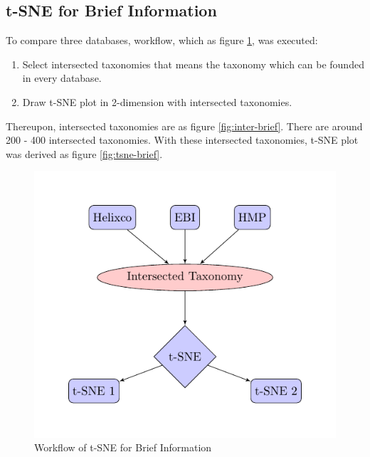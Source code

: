 \documentclass[a4paper]{article}
\begin{document}
        \subsection{t-SNE for Brief Information}
            To compare three databases, workflow, which as figure \ref{fig:workflow-brief}, was executed:
            \begin{enumerate}
                \item Select intersected taxonomies that means the taxonomy which can be founded in every database.
                \item Draw t-SNE plot in 2-dimension with intersected taxonomies.
            \end{enumerate}

            Thereupon, intersected taxonomies are as figure \ref{fig:inter-brief}. There are around 200 - 400 intersected taxonomies. With these intersected taxonomies, t-SNE plot was derived as figure \ref{fig:tsne-brief}.

            \begin{figure}[p]
                \centering
                \includegraphics[width=0.3 \linewidth]{figures/tikz/brief.pdf}
                \caption{Workflow of t-SNE for Brief Information}
                \label{fig:workflow-brief}
            \end{figure}
\end{document}
